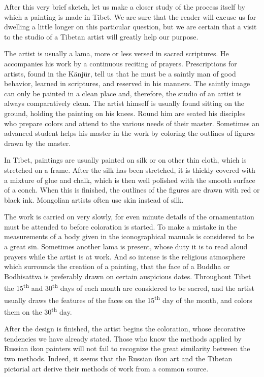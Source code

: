 \documentclass[a4paper, 12pt, oneside]{article}
\begin{document}
After this very brief sketch, let us make a closer study of the process itself by which a painting is made in Tibet. We are sure that the reader will excuse us for dwelling a little longer on this particular question, but we are certain that a visit to the studio of a Tibetan artist will greatly help our purpose.

The artist is usually a lama, more or less versed in sacred scriptures. He accompanies his work by a continuous reciting of prayers. Prescriptions for artists, found in the Känjür, tell us that he must be a saintly man of good behavior, learned in scriptures, and reserved in his manners. The saintly image can only be painted in a clean place and, therefore, the studio of an artist is always comparatively clean. The artist himself is usually found sitting on the ground, holding the painting on his knees. Round him are seated his disciples who prepare colors and attend to the various needs of their master. Sometimes an advanced student helps his master in the work by coloring the outlines of figures drawn by the master.

In Tibet, paintings are usually painted on silk or on other thin cloth, which is stretched on a frame. After the silk has been stretched, it is thickly covered with a mixture of glue and chalk, which is then well polished with the smooth surface of a conch. When this is finished, the outlines of the figures are drawn with red or black ink. Mongolian artists often use skin instead of silk.

The work is carried on very slowly, for even minute details of the ornamentation must be attended to before coloration is started. To make a mistake in the measurements of a body given in the iconographical manuals is considered to be a great sin. Sometimes another lama is present, whose duty it is to read aloud prayers while the artist is at work. And so intense is the religious atmosphere which surrounds the creation of a painting, that the face of a Buddha or Bodhisattva is preferably drawn on certain auspicious dates. Throughout Tibet the 15\textsuperscript{th} and 30\textsuperscript{th} days of each month are considered to be sacred, and the artist usually draws the features of the faces on the 15\textsuperscript{th} day of the month, and colors them on the 30\textsuperscript{th} day.

After the design is finished, the artist begins the coloration, whose decorative tendencies we have already stated. Those who know the methods applied by Russian ikon painters will not fail to recognize the great similarity between the two methods. Indeed, it seems that the Russian ikon art and the Tibetan pictorial art derive their methods of work from a common source.
\end{document}
